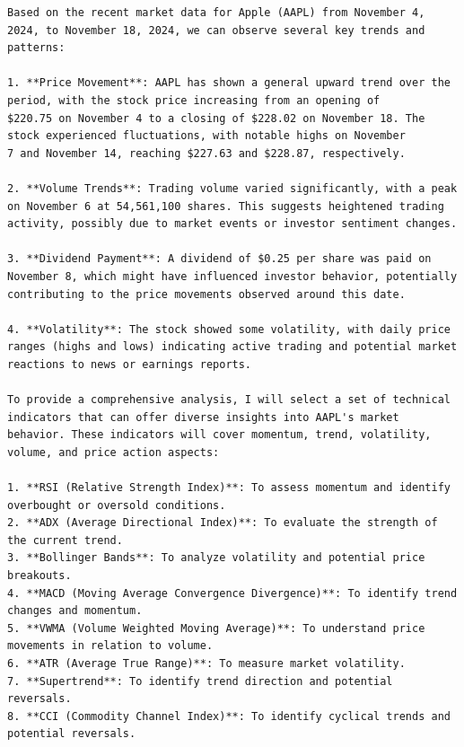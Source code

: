 \begin{tcolorbox}
\begin{lstlisting}[style=agentbase]
Based on the recent market data for Apple (AAPL) from November 4, 2024, to November 18, 2024, we can observe several key trends and patterns:

1. **Price Movement**: AAPL has shown a general upward trend over the period, with the stock price increasing from an opening of
$220.75 on November 4 to a closing of $228.02 on November 18. The stock experienced fluctuations, with notable highs on November
7 and November 14, reaching $227.63 and $228.87, respectively.

2. **Volume Trends**: Trading volume varied significantly, with a peak on November 6 at 54,561,100 shares. This suggests heightened trading activity, possibly due to market events or investor sentiment changes.

3. **Dividend Payment**: A dividend of $0.25 per share was paid on November 8, which might have influenced investor behavior, potentially contributing to the price movements observed around this date.

4. **Volatility**: The stock showed some volatility, with daily price ranges (highs and lows) indicating active trading and potential market reactions to news or earnings reports.

To provide a comprehensive analysis, I will select a set of technical indicators that can offer diverse insights into AAPL's market behavior. These indicators will cover momentum, trend, volatility, volume, and price action aspects:

1. **RSI (Relative Strength Index)**: To assess momentum and identify overbought or oversold conditions.
2. **ADX (Average Directional Index)**: To evaluate the strength of the current trend.
3. **Bollinger Bands**: To analyze volatility and potential price breakouts.
4. **MACD (Moving Average Convergence Divergence)**: To identify trend changes and momentum.
5. **VWMA (Volume Weighted Moving Average)**: To understand price movements in relation to volume.
6. **ATR (Average True Range)**: To measure market volatility.
7. **Supertrend**: To identify trend direction and potential reversals.
8. **CCI (Commodity Channel Index)**: To identify cyclical trends and potential reversals.


\end{lstlisting}
\end{tcolorbox}
